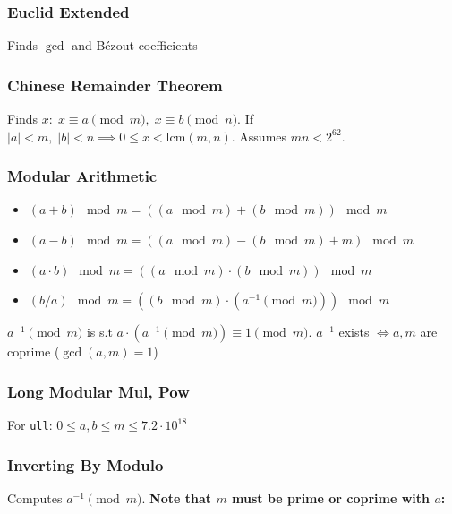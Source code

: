 \subsubsection{Euclid Extended}

Finds $\gcd$ and Bézout coefficients

\subsubsection{Chinese Remainder Theorem}

Finds $x:\; x \equiv a \pmod{m},\; x \equiv b \pmod{n}$.
If $|a| < m,\; |b| < n \implies 0 \le x < \text{lcm}(m,n)$.
Assumes $mn < 2^{62}$.

\subsubsection{Modular Arithmetic}

\vspace{1em}
\begin{itemize}
  \item $(a + b) \mod m = ((a \mod m) + (b \mod m)) \mod m$
  \item $(a - b) \mod m = ((a \mod m) - (b \mod m) + m) \mod m$
  \item $(a \cdot b) \mod m = ((a \mod m) \cdot (b \mod m)) \mod m$
  \item $(b / a) \mod m = ((b \mod m) \cdot (a^{-1} \pmod m)) \mod m$
\end{itemize}

\vspace{-0.2em}
$a^{-1} \pmod{m}$ is s.t $a \cdot (a^{-1} \pmod{m}) \equiv 1 \pmod{m}$. $a^{-1}$ exists $\iff a, m$ are coprime ($\gcd{(a,m)} = 1$)

\subsubsection{Long Modular Mul, Pow}
For \verb|ull|: $0 \le a, b \le m \le 7.2 \cdot 10^{18}$

\subsubsection{Inverting By Modulo}

Computes $a^{-1} \pmod m$. \bf{Note that $m$ must be prime or coprime with $a$}:

